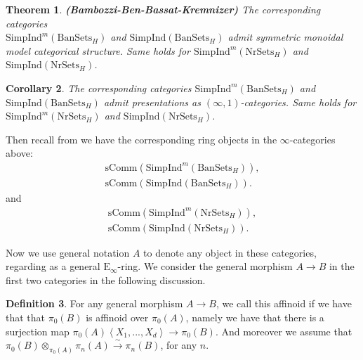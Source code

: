 \documentclass[12pt]{amsart}
\newtheorem{theorem}{Theorem}[section]
\newtheorem{corollary}[theorem]{Corollary}
\theoremstyle{definition}
\newtheorem{definition}[theorem]{Definition}
\numberwithin{equation}{section}
\begin{document}
\begin{theorem}\mbox{\bf{(Bambozzi-Ben-Bassat-Kremnizer)}} The corresponding categories\\
 $\mathrm{Simp}\mathrm{Ind}^m(\mathrm{BanSets}_{H})$ and $\mathrm{Simp}\mathrm{Ind}(\mathrm{BanSets}_{H})$ admit symmetric monoidal model categorical structure. Same holds for $\mathrm{Simp}\mathrm{Ind}^m(\mathrm{NrSets}_{H})$ and $\mathrm{Simp}\mathrm{Ind}(\mathrm{NrSets}_{H})$.	
\end{theorem}

\begin{corollary}
The corresponding categories $\mathrm{Simp}\mathrm{Ind}^m(\mathrm{BanSets}_{H})$ and $\mathrm{Simp}\mathrm{Ind}(\mathrm{BanSets}_{H})$ admit presentations as $(\infty,1)$-categories. Same holds for $\mathrm{Simp}\mathrm{Ind}^m(\mathrm{NrSets}_{H})$ and $\mathrm{Simp}\mathrm{Ind}(\mathrm{NrSets}_{H})$.	
\end{corollary}



\indent Then recall from \cite[Remark 3.16]{BBBK} we have the corresponding ring objects in the $\infty$-categories above:
\begin{align}
\mathrm{sComm}(\mathrm{Simp}\mathrm{Ind}^m(\mathrm{BanSets}_{H})),\\
\mathrm{sComm}(\mathrm{Simp}\mathrm{Ind}(\mathrm{BanSets}_{H})).	
\end{align}
and 
\begin{align}
\mathrm{sComm}(\mathrm{Simp}\mathrm{Ind}^m(\mathrm{NrSets}_{H})),\\
\mathrm{sComm}(\mathrm{Simp}\mathrm{Ind}(\mathrm{NrSets}_{H})).	
\end{align}






\indent Now we use general notation $A$ to denote any object in these categories, regarding as a general $\mathrm{E}_\infty$-ring. We consider the general morphism $A\rightarrow B$ in the first two categories in the following discussion.



\begin{definition}
For any general morphism $A\rightarrow B$, we call this affinoid if we have that that $\pi_0(B)$ is affinoid over $\pi_0(A)$, namely we have that there is a surjection map $\pi_0(A)\left<X_1,...,X_d\right>\rightarrow \pi_0(B)$. And moreover we assume that $\pi_0(B)\otimes_{\pi_0(A)}\pi_n(A)\overset{\sim}{\rightarrow}\pi_n(B)$, for any $n$. 	
\end{definition}
\end{document}
